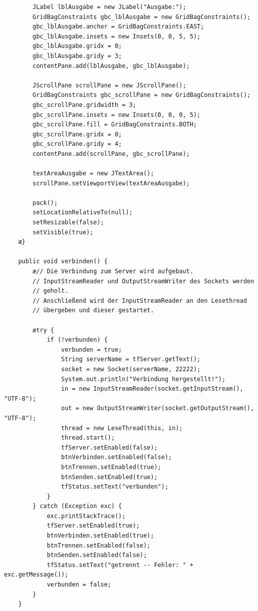 \begin{lstlisting}
        JLabel lblAusgabe = new JLabel("Ausgabe:");
        GridBagConstraints gbc_lblAusgabe = new GridBagConstraints();
        gbc_lblAusgabe.anchor = GridBagConstraints.EAST;
        gbc_lblAusgabe.insets = new Insets(0, 0, 5, 5);
        gbc_lblAusgabe.gridx = 0;
        gbc_lblAusgabe.gridy = 3;
        contentPane.add(lblAusgabe, gbc_lblAusgabe);

        JScrollPane scrollPane = new JScrollPane();
        GridBagConstraints gbc_scrollPane = new GridBagConstraints();
        gbc_scrollPane.gridwidth = 3;
        gbc_scrollPane.insets = new Insets(0, 0, 0, 5);
        gbc_scrollPane.fill = GridBagConstraints.BOTH;
        gbc_scrollPane.gridx = 0;
        gbc_scrollPane.gridy = 4;
        contentPane.add(scrollPane, gbc_scrollPane);

        textAreaAusgabe = new JTextArea();
        scrollPane.setViewportView(textAreaAusgabe);

        pack();
        setLocationRelativeTo(null);
        setResizable(false);
        setVisible(true);
    æ}

	public void verbinden() {
	    æ// Die Verbindung zum Server wird aufgebaut.
	    // InputStreamReader und OutputStreamWriter des Sockets werden
	    // geholt.
	    // Anschließend wird der InputStreamReader an den Lesethread
	    // übergeben und dieser gestartet.

	    ætry {
	        if (!verbunden) {
	            verbunden = true;
	            String serverName = tfServer.getText();
	            socket = new Socket(serverName, 22222);
	            System.out.println("Verbindung hergestellt!");
	            in = new InputStreamReader(socket.getInputStream(), "UTF-8");
	            out = new OutputStreamWriter(socket.getOutputStream(), "UTF-8");
	            thread = new LeseThread(this, in);
	            thread.start();
	            tfServer.setEnabled(false);
                btnVerbinden.setEnabled(false);
                btnTrennen.setEnabled(true);
                btnSenden.setEnabled(true);
                tfStatus.setText("verbunden");
            }
        } catch (Exception exc) {
            exc.printStackTrace();
            tfServer.setEnabled(true);
            btnVerbinden.setEnabled(true);
            btnTrennen.setEnabled(false);
            btnSenden.setEnabled(false);
            tfStatus.setText("getrennt -- Fehler: " + exc.getMessage());
            verbunden = false;
        }
    }


\end{lstlisting}
